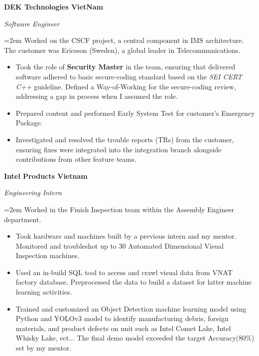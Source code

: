 \documentclass[10pt]{article}
\newcommand{\work}[4]{
  \noindent  \textbf{#1}
  \hfill 
\framebox{%
  \parbox{9em}{%
  \centering\textbf{#2}}} \par
  \noindent \textit{#3} \par
  \vspace*{0.5em}
  \noindent\hangindent=2em\hangafter=0 \small #4 
\normalsize \par}
\begin{document}
\work{DEK Technologies VietNam}
{Nov 2021--May 2023}
{Software Engineer}
{Worked on the CSCF project, a central component in IMS architecture.
 The customer was Ericsson (Sweden), a global leader in Telecommunications.

\begin{itemize}
    \item Took the role of \textbf{Security Master} in the team, ensuring that delivered software adhered to basic secure-coding standard based on the \textit{SEI CERT C++} guideline.
     Defined a Way-of-Working for the secure-coding review, addressing a gap in process when I assumed the role.
    \item Prepared content and performed Early System Test for customer's Emergency Package.
    \item Investigated and resolved the trouble reports (TRs) from the customer, ensuring fixes were integrated into the integration branch alongside contributions from other feature teams.
\end{itemize}}


\work{Intel Products Vietnam}
{Aug 2020--Feb 2021}
{Engineering Intern}
{Worked in the Finish Inspection team within the Assembly Engineer department.
\begin{itemize}
    \item Took hardware and machines built by a previous intern and my mentor. 
    Monitored and troubleshot up to 30 Automated Dimensional Visual Inspection machines.
    \item Used an in-build SQL tool to access and crawl visual data from VNAT factory database. Preprocessed the data to build a dataset for latter machine learning activities.
    \item Trained and customized an Object Detection machine learning model using Python and YOLOv3 model to identify manufacturing debris, foreign materials, and product defects on unit such as Intel Comet Lake, Intel Whisky Lake, ect...
    The final demo model exceeded the target Accuracy(80\%) set by my mentor.
\end{itemize}}

\end{document}
